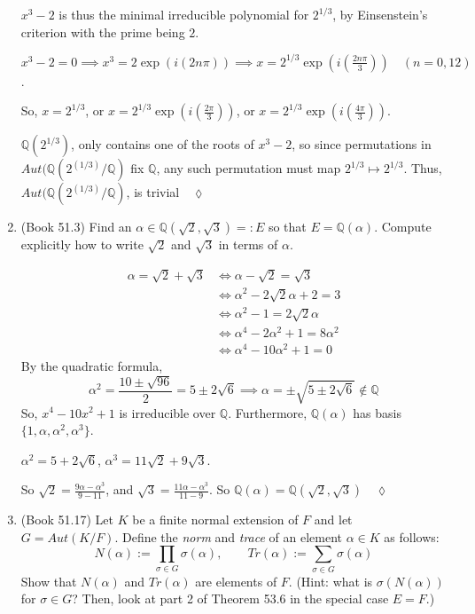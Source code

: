 \documentclass{article}
\newcommand\Q{\mathbb{Q}}
\begin{document}
\begin{enumerate}
  $x^3 - 2$ is thus the minimal irreducible polynomial for $2^{1/3}$,
  by Einsenstein's criterion with the prime being $2$.

  $x^3-2 = 0 \implies x^3 = 2\exp(i(2n\pi)) \implies x =
  2^{1/3}\exp(i\left(\frac{2n\pi}{3}\right))\quad (n = 0,1
  2)$.

  So, $x= 2^{1/3}$, or $x =
  2^{1/3}\exp(i\left(\frac{2\pi}{3}\right))$, or $x = 2^{1/3}\exp(i\left(\frac{4\pi}{3}\right))$.

  $\Q(2^{1/3})$, only contains one of the roots of $x^3-2$, so since
  permutations in $Aut(\Q(2^{(1/3)} / \Q)$ fix $\Q$, any such
  permutation must map $2^{1/3}\mapsto 2^{1/3}$. Thus,
  $Aut(\Q(2^{(1/3)} / \Q)$, is trivial$\quad \lozenge$

\item (Book 51.3) Find an $\alpha \in \Q(\sqrt{2}, \sqrt{3}) =: E$ so that $E = \Q(\alpha)$. Compute explicitly how to write $\sqrt 2$ and $\sqrt 3$ in terms of $\alpha$.

  \begin{align*} \alpha = \sqrt{2} +\sqrt{3}
    &\iff \alpha-\sqrt{2} = \sqrt{3}\\
    &\iff \alpha^2-2\sqrt{2}\alpha +2 = 3\\
    &\iff \alpha^2  -1= 2\sqrt{2}\alpha\\
    &\iff \alpha^4 -2\alpha^2 +1= 8\alpha^2\\
    &\iff \alpha^4 -10\alpha^2 +1= 0
  \end{align*}
  By the quadratic formula,
  \[\alpha^2 = \frac{10 \pm \sqrt{96}}{2} = 5 \pm 2\sqrt{6} \implies
    \alpha = \pm \sqrt{5 \pm 2\sqrt{6}}\not\in \Q\]
  So, $x^4-10x^2 +1$ is irreducible over $\Q$. Furthermore,
  $\Q(\alpha)$ has basis $\{1,\alpha,\alpha^2,\alpha^3\}$.

  $\alpha^2 = 5+2\sqrt{6}$, $\alpha^3 = 11\sqrt{2}+9\sqrt{3}$.

  So $\sqrt{2} = \frac{9\alpha -\alpha^3}{9-11}$, and $\sqrt{3} =
  \frac{11\alpha -\alpha^3}{11-9}$. So $\Q(\alpha) =
  \Q(\sqrt{2},\sqrt{3})\quad \lozenge$

\item (Book 51.17) Let $K$ be a finite normal extension of $F$ and let $G = Aut(K/F)$. Define the \emph{norm} and \emph{trace} of an element $\alpha \in K$ as follows:
\[
N(\alpha) := \prod_{\sigma \in G} \sigma(\alpha),\quad \quad Tr(\alpha) := \sum_{\sigma \in G} \sigma(\alpha)
\]
Show that $N(\alpha)$ and $Tr(\alpha)$ are elements of $F$. (Hint: what is $\sigma(N(\alpha))$ for $\sigma \in G$? Then, look at part 2 of Theorem 53.6 in the special case $E = F$.)


\end{enumerate}
\end{document}

